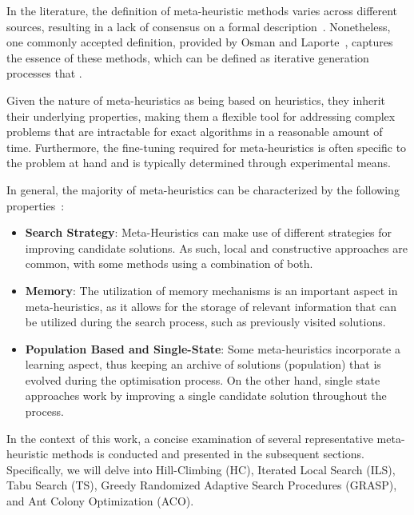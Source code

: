In the literature, the definition of meta-heuristic methods varies across
different sources, resulting in a lack of consensus on a formal
description~\cite{osman1996metaheuristics,blummetaheuristics,festa2014brief,luke2013essentialsa}.
Nonetheless, one commonly accepted definition, provided by Osman and
Laporte~\cite{osman1996metaheuristics}, captures the essence of these methods,
which can be defined as iterative generation processes that .

Given the nature of meta-heuristics as being based on heuristics, they inherit
their underlying properties, making them a flexible tool for addressing complex
problems that are intractable for exact algorithms in a reasonable amount of
time. Furthermore, the fine-tuning required for meta-heuristics is often
specific to the problem at hand and is typically determined through experimental
means.

In general, the majority of meta-heuristics can be characterized by the following
properties~\cite{blummetaheuristics}:
\begin{itemize}
  \item \textbf{Search Strategy}: Meta-Heuristics can make use of different
        strategies for improving candidate solutions. As such, local and
        constructive approaches are common, with some methods using a combination of
        both.

  \item \textbf{Memory}: The utilization of memory mechanisms is an important
        aspect in meta-heuristics, as it allows for the storage of relevant
        information that can be utilized during the search process, such as
        previously visited solutions.

  \item \textbf{Population Based and Single-State}: Some meta-heuristics
        incorporate a learning aspect, thus keeping an archive of solutions
        (population) that is evolved during the optimisation process. On the other
        hand, single state approaches work by improving a single candidate solution
        throughout the process.
\end{itemize}

In the context of this work, a concise examination of several representative
meta-heuristic methods is conducted and presented in the subsequent sections.
Specifically, we will delve into Hill-Climbing (HC), Iterated Local Search
(ILS), Tabu Search (TS), Greedy Randomized Adaptive Search Procedures (GRASP),
and Ant Colony Optimization (ACO).

